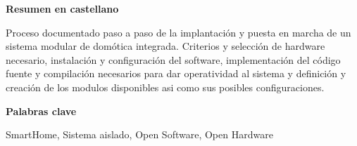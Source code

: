 
\newpage

\thispagestyle{empty}

\begin{center}

{\bf \Huge Resumen en castellano}

  \end{center}
\vspace{1cm}

Proceso documentado paso a paso de la implantación y puesta en marcha de un sistema modular de domótica integrada. Criterios y selección de hardware necesario, instalación y configuración del software, implementación del código fuente y compilación necesarios para dar operatividad al sistema y definición y creación de los modulos disponibles asi como sus posibles configuraciones.

\vspace{1cm}


\begin{center}

{\bf \Large Palabras clave}

   \end{center}

   \vspace{0.5cm}

   SmartHome, Sistema aislado, Open Software, Open Hardware
